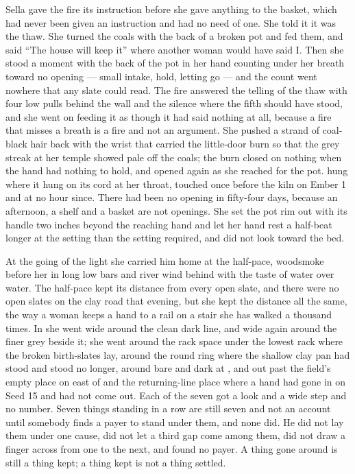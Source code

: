 \scenebreak

Sella gave the fire its instruction before she gave anything to the basket, which had never been given an instruction and had no need of one. She told it it was the thaw. She turned the coals with the back of a broken pot and fed them, and said “The house will keep it” where another woman would have said I. Then she stood a moment with the back of the pot in her hand counting under her breath toward no opening --- small intake, hold, letting go --- and the count went nowhere that any slate could read. The fire answered the telling of the thaw with four low pulls behind the wall and the silence where the fifth should have stood, and she went on feeding it as though it had said nothing at all, because a fire that misses a breath is a fire and not an argument. She pushed a strand of coal-black hair back with the wrist that carried the little-door burn so that the grey streak at her temple showed pale off the coals; the burn closed on nothing when the hand had nothing to hold, and opened again as she reached for the pot.  hung where it hung on its cord at her throat, touched once before the kiln on Ember 1 and at no hour since. There had been no opening in fifty-four days, because an afternoon, a shelf and a basket are not openings. She set the pot rim out with its handle two inches beyond the reaching hand and let her hand rest a half-beat longer at the setting than the setting required, and did not look toward the bed.

At the going of the light she carried him home at the half-pace, woodsmoke before her in long low bars and river wind behind with the taste of water over water. The half-pace kept its distance from every open slate, and there were no open slates on the clay road that evening, but she kept the distance all the same, the way a woman keeps a hand to a rail on a stair she has walked a thousand times. In  she went wide around the clean dark line, and wide again around the finer grey beside it; she went around the rack space under the lowest rack where the broken birth-slates lay, around the round ring where the shallow clay pan had stood and stood no longer, around  bare and dark at , and out past the field's empty place on  east of  and the returning-line place where a hand had gone in on Seed 15 and had not come out. Each of the seven got a look and a wide step and no number. Seven things standing in a row are still seven and not an account until somebody finds a payer to stand under them, and none did. He did not lay them under one cause, did not let a third gap come among them, did not draw a finger across from one to the next, and found no payer. A thing gone around is still a thing kept; a thing kept is not a thing settled.

